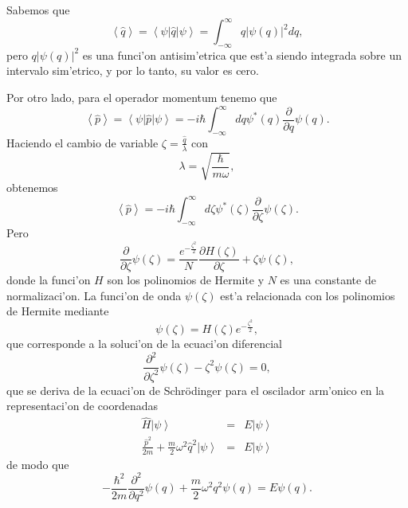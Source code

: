 Sabemos que
\begin{equation}
\left\langle \hat{q}\right> =\left\langle \psi\right| \hat
{q}\left| \psi\right>=\int_{-\infty}^{\infty}q\left| \psi\left( q\right) \right| ^{2}dq,
\end{equation} 
pero $q\left| \psi\left( q\right) \right| ^{2}$ es una funci'on
antisim'etrica que est'a siendo integrada sobre un intervalo sim'etrico,
y por lo tanto, su valor es cero.

Por otro lado, para el operador momentum tenemo que
\begin{equation}
\left\langle \hat{p}\right>
=\left\langle \psi\right| \hat{p}\left| \psi\right>
=-i\hbar\int_{-\infty}^{\infty}dq\psi^{\ast}\left( q\right) \frac
{\partial}{\partial q}\psi\left( q\right) .
\end{equation} 
Haciendo el cambio de variable $\zeta=\frac{\hat{q}}{\lambda}$ con
\begin{equation}
\lambda=\sqrt
{\frac{\hbar}{m\omega}},\label{sust}
\end{equation}
obtenemos
\begin{equation}
\left\langle \hat{p}\right> =-i\hbar\int_{-\infty}^{\infty}d\zeta
\psi^{\ast}\left( \zeta\right) \frac{\partial}{\partial\zeta}\psi\left(
\zeta\right) .\label{p}
\end{equation}
Pero
\begin{equation}
\frac{\partial}{\partial\zeta}\psi\left( \zeta\right) =\frac{e^{-\frac
{\zeta^{2}}{2}}}{N}\frac{\partial H\left( \zeta\right) }{\partial\zeta
}+\zeta\psi\left( \zeta\right) ,\label{zeta}%
\end{equation}
donde la funci'on $H$ son los polinomios de Hermite y $N$ es una constante de
normalizaci'on. La funci'on de onda $\psi\left( \zeta\right) $
est'a relacionada con los polinomios de Hermite mediante%
\begin{equation}
\psi\left( \zeta\right) =H\left( \zeta\right) e^{-\frac{\zeta^{2}}{2}},
\end{equation}
que corresponde a la soluci'on de la ecuaci'on diferencial
\begin{equation}
\frac{\partial^{2}}{\partial\zeta^{2}}\psi\left( \zeta\right) -\zeta^{2}%
\psi\left( \zeta\right) =0,
\end{equation}
que se deriva de la ecuaci'on de Schr\"{o}dinger para el oscilador
arm'onico en la representaci'on de coordenadas
\begin{eqnarray}
\hat{H}\left| \psi\right> &=& E\left| \psi\right>  \\
\frac{\hat{p}^{2}}{2m}+\frac{m}{2}\omega^{2}\hat{q}^{2}\left|
\psi\right> & = &E\left| \psi\right>
\end{eqnarray}
de modo que
\begin{equation}
-\frac{\hbar^{2}}{2m}\frac{\partial^{2}}{\partial q^{2}}\psi\left( q\right)
+\frac{m}{2}\omega^{2}q^{2}\psi\left( q\right) =E\psi\left( q\right).
\end{equation}


